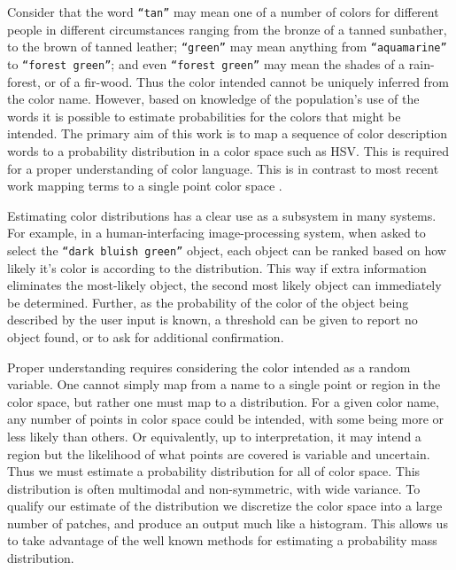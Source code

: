 \documentclass[11pt,a4paper]{article}
\newcommand{\parencite}{\citep}
\begin{document}
Consider that the word \texttt{``tan''} may mean one of a number of colors for different people in different circumstances ranging from the bronze of a tanned sunbather, to the brown of tanned leather;
\texttt{``green''} may mean anything from \texttt{``aquamarine''} to \texttt{``forest green''};
 and even \texttt{``forest green''} may mean the shades of a rain-forest, or of a fir-wood.
Thus the color intended cannot be uniquely inferred from the color name.
However, based on knowledge of the population's use of the words it is possible to estimate probabilities for the colors that might be intended.
The primary aim of this work is to map a sequence of color description words to a probability distribution in a color space such as HSV.
This is required for a proper understanding of color language.
This is in contrast to most recent work mapping terms to a single point color space \parencite{DBLP:journals/corr/KawakamiDRS16}.


Estimating color distributions has a clear use as a subsystem in many systems.
For example, in a human-interfacing image-processing system, when asked to select the \texttt{``dark bluish green''} object, each object can be ranked based on how likely it's color is according to the distribution.
This way if extra information eliminates the most-likely object, the second most likely object can immediately be determined.
Further, as the probability of the color of the object being described by the user input is known, a threshold can be given to report no object found, or to ask for additional confirmation.


Proper understanding requires considering the color intended as a random variable.
One cannot simply map from a name to a single point or region in the color space, but rather one must map to a distribution.
For a given color name, any number of points in color space could be intended, with some being more or less likely than others.
Or equivalently, up to interpretation, it may intend a region but the likelihood of what points are covered is variable and uncertain.
Thus we must estimate a probability distribution for all of color space.
This distribution is often multimodal and non-symmetric, with wide variance.
To qualify our estimate of the distribution we discretize the color space into a large number of patches, and produce an output much like a histogram.
This allows us to take advantage of the well known methods for estimating a probability mass distribution.
\end{document}
